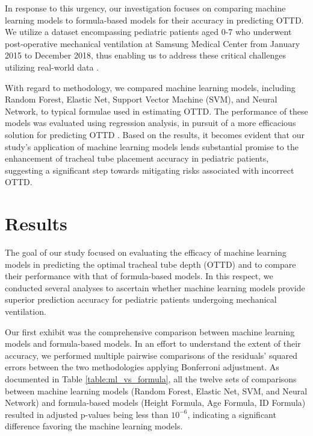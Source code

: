 \documentclass[11pt]{article}
\begin{document}
In response to this urgency, our investigation focuses on comparing machine learning models to formula-based models for their accuracy in predicting OTTD. We utilize a dataset encompassing pediatric patients aged 0-7 who underwent post-operative mechanical ventilation at Samsung Medical Center from January 2015 to December 2018, thus enabling us to address these critical challenges utilizing real-world data \cite{Ingelse2017EarlyFO, Mariano2005ACO}.

With regard to methodology, we compared machine learning models, including Random Forest, Elastic Net, Support Vector Machine (SVM), and Neural Network, to typical formulae used in estimating OTTD. The performance of these models was evaluated using regression analysis, in pursuit of a more efficacious solution for predicting OTTD \cite{Narula2018EnteralNT, De2022UnlockingHD}. Based on the results, it becomes evident that our study's application of machine learning models lends substantial promise to the enhancement of tracheal tube placement accuracy in pediatric patients, suggesting a significant step towards mitigating risks associated with incorrect OTTD.

\section*{Results}

The goal of our study focused on evaluating the efficacy of machine learning models in predicting the optimal tracheal tube depth (OTTD) and to compare their performance with that of formula-based models. In this respect, we conducted several analyses to ascertain whether machine learning models provide superior prediction accuracy for pediatric patients undergoing mechanical ventilation.

Our first exhibit was the comprehensive comparison between machine learning models and formula-based models. In an effort to understand the extent of their accuracy, we performed multiple pairwise comparisons of the residuals' squared errors between the two methodologies applying Bonferroni adjustment. As documented in Table {}\ref{table:ml_vs_formula}, all the twelve sets of comparisons between machine learning models (Random Forest, Elastic Net, SVM, and Neural Network) and formula-based models (Height Formula, Age Formula, ID Formula) resulted in adjusted p-values being less than $10^{-6}$, indicating a significant difference favoring the machine learning models.
\end{document}
